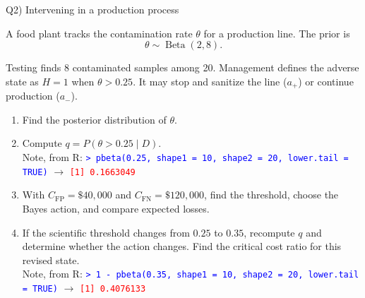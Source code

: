 \documentclass[aspectratio=43,10pt]{beamer}
\newcommand{\CFP}{C_{\mathrm{FP}}}
\newcommand{\CFN}{C_{\mathrm{FN}}}
\begin{document}

\begin{frame}{Q2) Intervening in a production process}

  A food plant tracks the contamination rate $\theta$ for a production
  line. The prior is
  \[
  \theta\sim\operatorname{Beta}(2,8).
  \]

  Testing finds 8 contaminated samples among 20. Management defines the
  adverse state as $H=1$ when $\theta>0.25$. It may stop and sanitize the
  line ($a_+$) or continue production ($a_-$).

  \vspace{0.1cm}

  \begin{enumerate}
    \item[a.] Find the posterior distribution of $\theta$.

    \item[b.] Compute $q=P(\theta>0.25\mid D)$.\\
    		  {
		      \tiny
              Note, from R:
              \textcolor{blue}{\texttt{> pbeta(0.25, shape1 = 10, shape2 = 20, lower.tail = TRUE)}}
              $\rightarrow$ \textcolor{red}{\texttt{[1] 0.1663049}}
              }

    \item[c.] With $\CFP=\$40{,}000$ and $\CFN=\$120{,}000$, find the
          threshold, choose the Bayes action, and compare expected losses.

    \item[d.] If the scientific threshold changes from $0.25$ to $0.35$,
          recompute $q$ and determine whether the action changes. Find the
          critical cost ratio for this revised state.\\
    		  {
		      \tiny
              Note, from R:
              \textcolor{blue}{\texttt{> 1 - pbeta(0.35, shape1 = 10, shape2 = 20, lower.tail = TRUE)}}
              $\rightarrow$ \textcolor{red}{\texttt{[1] 0.4076133}}
              }
  \end{enumerate}

\end{frame}

\end{document}
